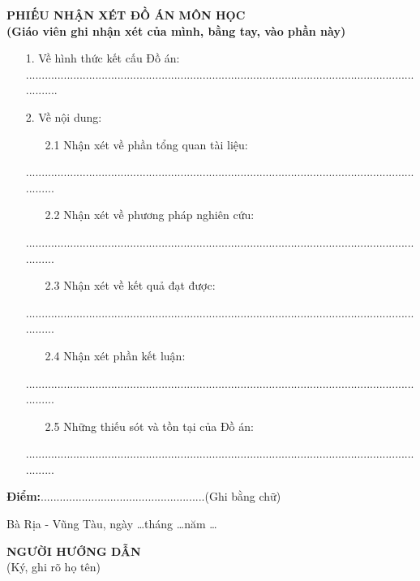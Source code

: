 \documentclass[12pt,a4paper]{report}
\begin{document}
\begin{center}
	\centering
	\textbf{PHIẾU NHẬN XÉT ĐỒ ÁN MÔN HỌC}\\
	\textbf{(Giáo viên ghi nhận xét của mình, bằng tay, vào phần này)}
\end{center}
\begin{enumerate}
	\item[1.] Về hình thức kết cấu Đồ án:\\.....................................................................................................................................
	\item[2.] Về nội dung: 
	\begin{enumerate}
		\item[2.1] Nhận xét về phần tổng quan tài liệu:
	\end{enumerate}
	\item[] ....................................................................................................................................
	\begin{enumerate}
		\item[2.2] Nhận xét về phương pháp nghiên cứu:
	\end{enumerate}
	\item[] ....................................................................................................................................
	\begin{enumerate}
		\item[2.3] Nhận xét về kết quả đạt được:
	\end{enumerate}
	\item[] ....................................................................................................................................
	\begin{enumerate}
		\item[2.4] Nhận xét phần kết luận:
	\end{enumerate}
	\item[] ....................................................................................................................................
	\begin{enumerate}
		\item[2.5] Những thiếu sót và tồn tại của Đồ án:
	\end{enumerate}
	\item[] ....................................................................................................................................
\end{enumerate}
\textbf{Điểm:}....................................................(Ghi bằng chữ)
\begin{flushright}
Bà Rịa - Vũng Tàu, ngày \ldots tháng \ldots năm \ldots \\
\end{flushright}
\hspace{300pt} \textbf{NGƯỜI HƯỚNG DẪN}\\
\hspace*{316pt} (Ký, ghi rõ họ tên)
\newpage
{}
\end{document}
